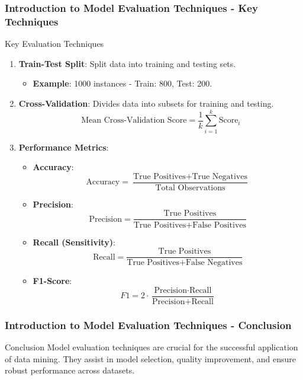 \documentclass[aspectratio=169]{beamer}
\begin{document}
\begin{frame}[fragile]
    \frametitle{Introduction to Model Evaluation Techniques - Key Techniques}
    \begin{block}{Key Evaluation Techniques}
        \begin{enumerate}
            \item \textbf{Train-Test Split}: Split data into training and testing sets.
                \begin{itemize}
                    \item \textbf{Example}: 1000 instances - Train: 800, Test: 200.
                \end{itemize}

            \item \textbf{Cross-Validation}: Divides data into subsets for training and testing.
                \begin{equation}
                \text{Mean Cross-Validation Score} = \frac{1}{k} \sum_{i=1}^{k} \text{Score}_i
                \end{equation}

            \item \textbf{Performance Metrics}:
                \begin{itemize}
                    \item \textbf{Accuracy}: 
                    \[
                    \text{Accuracy} = \frac{\text{True Positives} + \text{True Negatives}}{\text{Total Observations}}
                    \]
                    \item \textbf{Precision}:
                    \[
                    \text{Precision} = \frac{\text{True Positives}}{\text{True Positives} + \text{False Positives}}
                    \]
                    \item \textbf{Recall (Sensitivity)}:
                    \[
                    \text{Recall} = \frac{\text{True Positives}}{\text{True Positives} + \text{False Negatives}}
                    \]
                    \item \textbf{F1-Score}:
                    \[
                    F1 = 2 \cdot \frac{\text{Precision} \cdot \text{Recall}}{\text{Precision} + \text{Recall}}
                    \]
                \end{itemize}
        \end{enumerate}
    \end{block}
\end{frame}

\begin{frame}[fragile]
    \frametitle{Introduction to Model Evaluation Techniques - Conclusion}
    \begin{block}{Conclusion}
        Model evaluation techniques are crucial for the successful application of data mining. They assist in model selection, quality improvement, and ensure robust performance across datasets.
    \end{block}
\end{frame}
\end{document}
